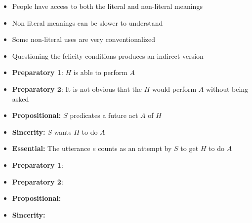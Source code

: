 \documentclass[headrule,footrule]{foils}
\begin{document}

\begin{exe}
  \ex
  \begin{xlist}
    \ex {}
    \ex {}
  \end{xlist}
  \ex 
  \begin{xlist}
    \ex {}
    \ex {}
  \end{xlist}
  \ex
  \begin{xlist}
    \ex {}
    \ex {}
  \end{xlist}
\end{exe}
\begin{itemize}
\item People have access to both the literal and non-literal meanings
\item Non literal meanings can be slower to understand
\item Some non-literal uses are very conventionalized 
  \\  \into {}
\item Questioning the felicity conditions produces an indirect version
\end{itemize}


\begin{small}
  \begin{itemize}
\item \textbf{Preparatory 1}: $H$ is able to perform  $A$
\item \textbf{Preparatory 2}: It is not obvious that the $H$ would perform $A$  without being asked
\item \textbf{Propositional:} $S$ predicates a future act $A$ of $H$
\item \textbf{Sincerity:}  $S$ wants $H$ to do $A$ 
\item \textbf{Essential:} The utterance $e$ counts as an attempt by $S$ to get $H$ to do $A$
\end{itemize}
\end{small}
  \begin{itemize}
\item \textbf{Preparatory 1}: 
\item \textbf{Preparatory 2}: 
\item \textbf{Propositional:} 
\item \textbf{Sincerity:}  
\end{itemize}
\end{document}

